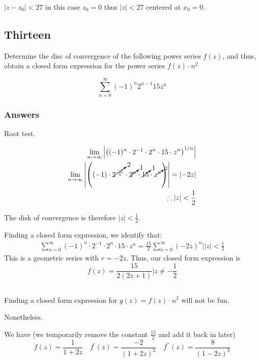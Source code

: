 \documentclass{article}
\begin{document}
$ |z - z_0| < 27 $ in this case $z_0 = 0$ thus $|z| <27$ centered at $x_0=0$.
\par

\subsection*{Thirteen}

Determine the disc of convergence of the following power series $f(z)$, and thus, obtain a closed form expression for the power series $f(z) \cdot n^2$

\begin{equation}\label{c13}
\sum_{n=0}^{\infty} (-1)^n2^{n-1}15z^n
\end{equation}


\subsubsection*{Answers}
Root test.

\begin{align*}
\lim_{n\to\infty} \left|\left( (-1)^n \cdot 2^{-1} \cdot 2^n \cdot 15 \cdot z^n \right)^{1/n}\right|\\
\lim_{n\to\infty} \left|\left( (-1) \cdot \cancelto{2}{2^{\frac{-1}{n}}} \cdot \cancelto{1}{2^n} \cdot \cancelto{1}{15} \cdot \cancelto{z}{z^n} \right)\right| = \left|-2z\right| \\
\therefore \left|z\right| < \frac{1}{2}
\end{align*}

The disk of convergence is therefore $\left|z\right| < \frac{1}{2}$.

Finding a closed form expression, we identify that:
\begin{align*}
\sum_{n=0}^{\infty}  (-1)^n \cdot 2^{-1} \cdot 2^n \cdot 15 \cdot z^n = \frac{15}{2} \sum_{n=0}^{\infty} (-2z)^n \Bigr| \left|z\right| < \frac{1}{2}
\end{align*}
This is a geometric series with $r = -2z$. Thus, our closed form expression is
\[
f(z) = \frac{15}{2(2z+1)} \Bigr| z \neq -\frac{1}{2}
\]

\subsection*{}

Finding a closed form expression for $g(z) = f(z) \cdot n^2$ will not be fun.

Nonetheless.

We have (we temporarily remove the constant $\frac{15}{2}$ and add it back in later)
\[
f(z) = \frac{1}{1+2z} \quad f^{'}(z) = \frac{-2}{(1+2z)^2} \quad f^{''}(z) = \frac{8}{(1-2z)^3}
\]
\end{document}
